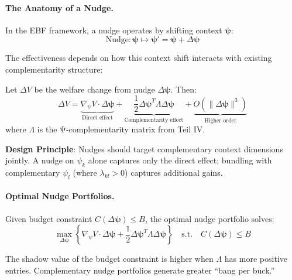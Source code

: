 \paragraph{The Anatomy of a Nudge.}

In the EBF framework, a nudge operates by shifting context $\boldsymbol{\psi}$:
\begin{equation}
\text{Nudge}: \boldsymbol{\psi} \mapsto \boldsymbol{\psi}' = \boldsymbol{\psi} + \Delta\boldsymbol{\psi}
\end{equation}

The effectiveness depends on how this context shift interacts with existing 
complementarity structure:

\begin{theorem}
\label{thm:nudge-effect}
Let $\Delta V$ be the welfare change from nudge $\Delta\boldsymbol{\psi}$. Then:
\begin{equation}
\Delta V = \underbrace{\nabla_{\psi} V \cdot \Delta\boldsymbol{\psi}}_{\text{Direct effect}} + 
\underbrace{\frac{1}{2} \Delta\boldsymbol{\psi}^T \Lambda \Delta\boldsymbol{\psi}}_{\text{Complementarity effect}} + 
\underbrace{O(\|\Delta\boldsymbol{\psi}\|^3)}_{\text{Higher order}}
\end{equation}
where $\Lambda$ is the Ψ-complementarity matrix from Teil IV.
\end{theorem}

\textbf{Design Principle}: Nudges should target complementary context dimensions 
jointly. A nudge on $\psi_k$ alone captures only the direct effect; bundling with 
complementary $\psi_l$ (where $\lambda_{kl} > 0$) captures additional gains.

\paragraph{Optimal Nudge Portfolios.}

Given budget constraint $C(\Delta\boldsymbol{\psi}) \leq B$, the optimal nudge 
portfolio solves:
\begin{equation}
\max_{\Delta\boldsymbol{\psi}} \left\{ \nabla_{\psi} V \cdot \Delta\boldsymbol{\psi} + 
\frac{1}{2} \Delta\boldsymbol{\psi}^T \Lambda \Delta\boldsymbol{\psi} \right\}
\quad \text{s.t.} \quad C(\Delta\boldsymbol{\psi}) \leq B
\end{equation}

\begin{proposition}
\label{prop:comp-premium}
The shadow value of the budget constraint is higher when $\Lambda$ has more 
positive entries. Complementary nudge portfolios generate greater ``bang per buck.''
\end{proposition}

